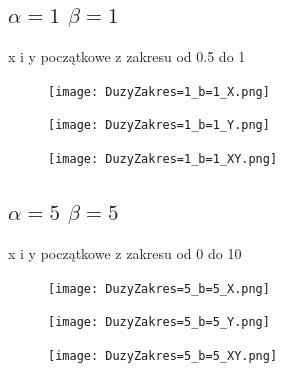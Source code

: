 \documentclass{article}
\begin{document}
    \newpage
    \subsection{$\alpha=1$ $\beta=1$}
    x i y początkowe z zakresu od 0.5 do 1
            \begin{figure}[ht]
        \centering
        \begin{minipage}{.5\textwidth}
            \centering
            \texttt{[image: DuzyZakres=1\_b=1\_X.png]}
            \label{fig:test11}
        \end{minipage}%
        \begin{minipage}{.5\textwidth}
            \centering
            \texttt{[image: DuzyZakres=1\_b=1\_Y.png]}
            \label{fig:test12}
        \end{minipage}
        \centering
        \begin{minipage}{.5\textwidth}
            \centering
            \texttt{[image: DuzyZakres=1\_b=1\_XY.png]}
            \label{fig:test13}
        \end{minipage}%
    \end{figure}


        \newpage
    \subsection{$\alpha=5$ $\beta=5$}
    x i y początkowe z zakresu od 0 do 10
            \begin{figure}[ht]
        \centering
        \begin{minipage}{.5\textwidth}
            \centering
            \texttt{[image: DuzyZakres=5\_b=5\_X.png]}
            \label{fig:test11}
        \end{minipage}%
        \begin{minipage}{.5\textwidth}
            \centering
            \texttt{[image: DuzyZakres=5\_b=5\_Y.png]}
            \label{fig:test12}
        \end{minipage}
        \centering
        \begin{minipage}{.5\textwidth}
            \centering
            \texttt{[image: DuzyZakres=5\_b=5\_XY.png]}
            \label{fig:test13}
        \end{minipage}%
    \end{figure}
\end{document}
